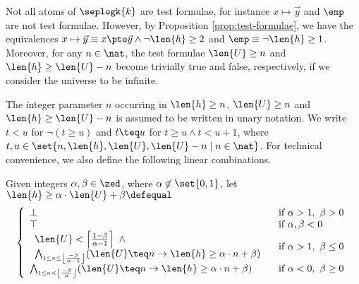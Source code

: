 {%
}

Not all atoms of $\seplogk{k}$ are test formulae, for instance $x
\mapsto \vec{y}$ and $\emp$ are not test formulae. However, by
Proposition \ref{prop:test-formulae}, we have the equivalences $x
\mapsto \vec{y} \equiv x \pto \vec{y} \wedge \neg\len{h} \geq 2$ and
$\emp \equiv \neg\len{h} \geq 1$. Moreover, for any $n \in \nat$, the
test formulae $\len{U}\geq n$ and $\len{h}\geq \len{U}-n$ become
trivially true and false, respectively, if we consider the universe to
be infinite.

The integer parameter $n$ occurring in $\len{h} \geq n$, $\len{U} \geq
n$ and $\len{h} \geq \len{U} - n$ is assumed to be written in unary
notation. We write $t < u$ for $\neg(t \geq u)$ and $t \teq u$ for $t
\geq u \wedge t < u + 1$, where $t,u \in
\set{n,\len{h},\len{U},\len{U}-n \mid n \in \nat}$. For technical
convenience, we also define the following linear combinations.

\begin{definition}\label{def:lin-comb}
  Given integers $\alpha,\beta \in \zed$, where
  $\alpha\not\in\set{0,1}$, let $\len{h} \geq \alpha \cdot \len{U} +
  \beta \defequal$
\[\left\{\begin{array}{ll}
\bot & \text{ if $\alpha > 1,~ \beta > 0$} \\
\top & \text{ if $\alpha, \beta < 0$} \\
\begin{array}{l}
\len{U} < \left\lceil\frac{1-\beta}{\alpha-1}\right\rceil ~\wedge \\
\bigwedge_{\scriptscriptstyle{1 \leq n \leq \left\lfloor\frac{-\beta}{\alpha - 1}\right\rfloor}}
(\len{U} \teq n \rightarrow \len{h} \geq \alpha \cdot n + \beta)
\end{array} & \text{ if $\alpha > 1,~ \beta \leq 0$} \\
\bigwedge_{\scriptscriptstyle{1 \leq n < \left\lfloor\frac{-\beta}{\alpha}\right\rfloor}}
	(\len{U} \teq n \rightarrow \len{h} \geq \alpha \cdot n + \beta) & 
\text{ if $\alpha < 0,~ \beta \geq 0$}
\end{array}\right.\]
\end{definition}

